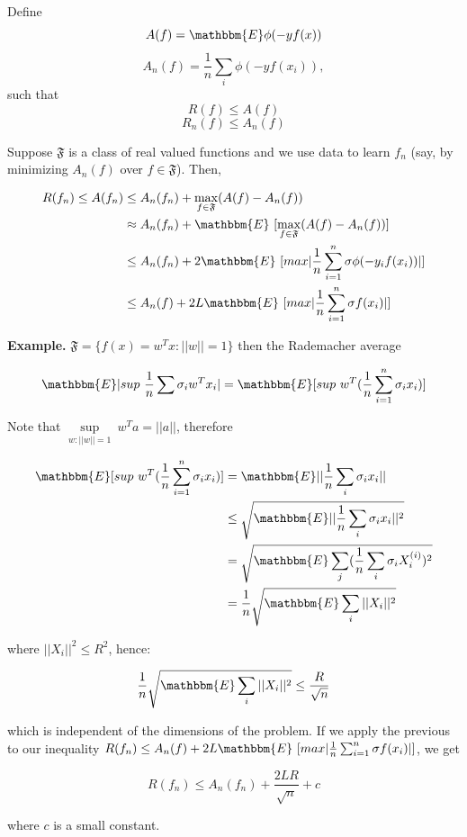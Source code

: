 \documentclass[11pt, english]{article}
\begin{document}
 Define $$A(f) = \mathbbm{E}\phi(-yf(x))$$ $$A_n(f) = \frac{1}{n}\sum_i \phi(-yf(x_i)),$$ such that 
 $$R(f) \leq A(f)$$
 $$R_n(f) \leq A_n(f)$$
 
 Suppose $\mathfrak{F}$ is a class of real valued functions and we use data to learn $f_n$ (say, by minimizing $A_n(f)$ over $f \in \mathfrak{F}$). Then,
 
 \begin{align*}
 R(f_n)\leq A(f_n) &\leq A_n(f_n) + \max_{f \in \mathfrak{F}}(A(f) - A_n(f))\\
 & \approx A_n(f_n) + \mathbbm{E}\ [\max_{f \in \mathfrak{F}}(A(f) - A_n(f))]\\
 & \leq A_n(f_n) + 2 \mathbbm{E}\ [max |\frac{1}{n} \sum_{i=1}^{n}\sigma \phi(-y_i f(x_i))|]\\
 & \leq A_n(f) + 2L \mathbbm{E}\ [max |\frac{1}{n} \sum_{i=1}^{n}\sigma f(x_i)|]
 \end{align*}
 
 \textbf{Example.} $\mathfrak{F} = \{f(x) = w^Tx : ||w|| = 1\}$ then the Rademacher average
 
 $$\mathbbm{E} |sup \ \frac{1}{n} \sum \sigma_i w^T x_i| = \mathbbm{E} [sup \ w^T(\frac{1}{n} \sum_{i=1}^{n} \sigma_i x_i)]$$
 
 Note that $\sup\limits_{w:||w||=1} \ w^T a = ||a||$, therefore
 
 \begin{align*}
 \mathbbm{E} [sup \ w^T(\frac{1}{n} \sum_{i=1}^{n} \sigma_i x_i)] &=\mathbbm{E} ||\frac{1}{n} \sum_i \sigma_i x_i||\\
 &\leq \sqrt{\mathbbm{E}||\frac{1}{n} \sum_i \sigma_i x_i||^2}\\
 &= \sqrt{\mathbbm{E} \sum_j (\frac{1}{n} \sum_i \sigma_i X_i^{(i)})^2}\\
 &= \frac{1}{n} \sqrt{\mathbbm{E} \sum_i ||X_i||^2}
 \end{align*}
 
 where $||X_i||^2 \leq R^2$, hence:
 
 $$\frac{1}{n} \sqrt{\mathbbm{E} \sum_i ||X_i||^2} \leq \frac{R}{\sqrt{n}}$$
 
 which is independent of the dimensions of the problem. If we apply the previous to our inequality $R(f_n) \leq A_n(f) + 2L \mathbbm{E}\ [max |\frac{1}{n} \sum_{i=1}^{n}\sigma f(x_i)|]$, we get
 
 $$R(f_n) \leq A_n(f_n) + \frac{2LR}{\sqrt{n}} + c$$
 
 where $c$ is a small constant.\\
 
\end{document}
